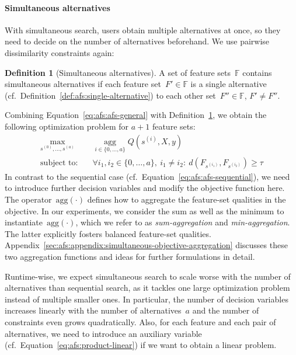 \documentclass{article}
\theoremstyle{definition}
\newtheorem{definition}[proposition]{Definition} %
\begin{document}
\paragraph{Simultaneous alternatives}

With simultaneous search, users obtain multiple alternatives at once, so they need to decide on the number of alternatives beforehand.
We use pairwise dissimilarity constraints again:
%
\begin{definition}[Simultaneous alternatives]
	A set of feature sets~$\mathbb{F}$ contains simultaneous alternatives if each feature set~$F' \in \mathbb{F}$ is a single alternative (cf.~Definition~\ref{def:afs:single-alternative}) to each other set~$F'' \in \mathbb{F}$, $F' \neq F''$.
	\label{def:afs:simultaneous-alternative}
\end{definition}
%
Combining Equation~\ref{eq:afs:afs-general} with Definition~\ref{def:afs:simultaneous-alternative}, we obtain the following optimization problem for $a+1$ feature sets:
%
\begin{equation}
	\begin{aligned}
		\max_{s^{(0)}, \dots, s^{(a)}} &\quad \operatorname*{agg}_{i \in \{0, \dots, a\}} Q(s^{(i)},X,y) \\
		\text{subject to:} &\quad \forall i_1, i_2 \in \{0, \dots, a\},~i_1 \neq i_2:~d(F_{s^{(i_1)}},F_{s^{(i_2)}}) \geq \tau
	\end{aligned}
	\label{eq:afs:afs-simultaneous}
\end{equation}
%
In contrast to the sequential case (cf.~Equation~\ref{eq:afs:afs-sequential}), we need to introduce further decision variables and modify the objective function here.
The operator~$\text{agg}(\cdot)$ defines how to aggregate the feature-set qualities in the objective.
In our experiments, we consider the sum as well as the minimum to instantiate~$\text{agg}(\cdot)$, which we refer to as \emph{sum-aggregation} and \emph{min-aggregation}.
The latter explicitly fosters balanced feature-set qualities.
Appendix~\ref{sec:afs:appendix:simultaneous-objective-aggregation} discusses these two aggregation functions and ideas for further formulations in detail.

Runtime-wise, we expect simultaneous search to scale worse with the number of alternatives than sequential search, as it tackles one large optimization problem instead of multiple smaller ones.
In particular, the number of decision variables increases linearly with the number of alternatives~$a$ and the number of constraints even grows quadratically.
Also, for each feature and each pair of alternatives, we need to introduce an auxiliary variable (cf.~Equation~\ref{eq:afs:product-linear}) if we want to obtain a linear problem.
\end{document}
